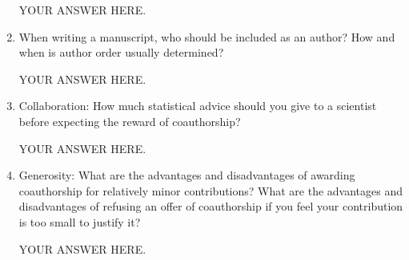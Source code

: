 \documentclass[12pt]{article}
\begin{document}
\begin{enumerate}
YOUR ANSWER HERE.

\item When writing a manuscript, who should be included as an author? How and when is author order usually determined? 

YOUR ANSWER HERE.

\item Collaboration: How much statistical advice should you give to a scientist before expecting the reward of coauthorship?

YOUR ANSWER HERE.

\item Generosity: What are the advantages and disadvantages of awarding coauthorship for relatively minor contributions? What are the advantages and disadvantages of refusing an offer of coauthorship if you feel your contribution is too small to justify it?

YOUR ANSWER HERE.

\end{enumerate}
\end{document}
